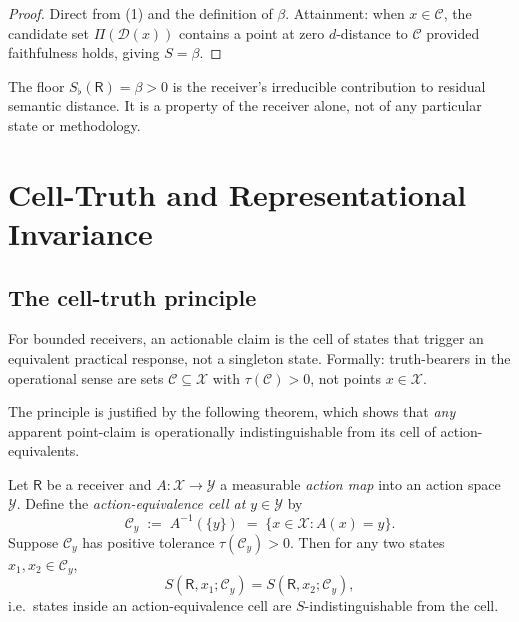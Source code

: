 \documentclass[twocolumn,11pt,a4paper]{article}
\newcommand{\D}{\mathcal{D}}
\newcommand{\X}{\mathcal{X}}
\newcommand{\Y}{\mathcal{Y}}
\newcommand{\Cell}{\mathcal{C}}
\newcommand{\receiver}{\mathsf{R}}
\newcommand{\Sfloor}{S_{\flat}}
\begin{document}
\begin{proof}
Direct from (1) and the definition of $\beta$.
Attainment: when $x\in\Cell$, the candidate set $\Pi(\D(x))$ contains a
point at zero $d$-distance to $\Cell$ provided faithfulness holds, giving
$S=\beta$.
\end{proof}

\begin{remark}\label{rem:floor-meaning}
The floor $\Sfloor(\receiver)=\beta>0$ is the receiver's irreducible
contribution to residual semantic distance. It is a property of the
receiver alone, not of any particular state or methodology.
\end{remark}

\section{Cell-Truth and Representational Invariance}
\label{sec:cell-truth}

\subsection{The cell-truth principle}

\begin{principle}\label{prin:cell-truth}
For bounded receivers, an actionable claim is the cell of states that
trigger an equivalent practical response, not a singleton state. Formally:
truth-bearers in the operational sense are sets $\Cell\subseteq\X$ with
$\tau(\Cell)>0$, not points $x\in\X$.
\end{principle}

The principle is justified by the following theorem, which shows that
\emph{any} apparent point-claim is operationally indistinguishable from its
cell of action-equivalents.

\begin{theorem}\label{thm:cell-truth}
Let $\receiver$ be a receiver and $A:\X\to\Y$ a measurable
\emph{action map} into an action space $\Y$. Define the
\emph{action-equivalence cell at $y\in\Y$} by
\[
\Cell_y \;:=\; A^{-1}(\{y\})\;=\;\{x\in\X:A(x)=y\}.
\]
Suppose $\Cell_y$ has positive tolerance $\tau(\Cell_y)>0$. Then for any
two states $x_1,x_2\in\Cell_y$,
\[
S(\receiver,x_1;\Cell_y)=S(\receiver,x_2;\Cell_y),
\]
i.e.\ states inside an action-equivalence cell are
$S$-indistinguishable from the cell.
\end{theorem}
\end{document}
